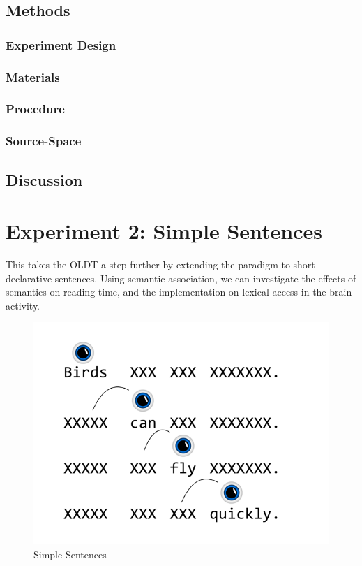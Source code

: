 \documentclass[english]{article}
\begin{document}
\subsection{Methods}
\subsubsection{Experiment Design}
\subsubsection{Materials}
\subsubsection{Procedure}

\subsubsection{Source-Space}

\subsection{Discussion}

\section{Experiment 2: Simple Sentences}

This takes the OLDT a step further by extending the paradigm to short
declarative sentences. Using semantic association, we can investigate the
effects of semantics on reading time, and the implementation on lexical
access in the brain activity.

\begin{figure}[H]
\begin{centering}
\includegraphics[scale=0.33]{simpsent}
\par\end{centering}
\caption{\label{fig:simpsent} Simple Sentences}
\end{figure}
\end{document}
